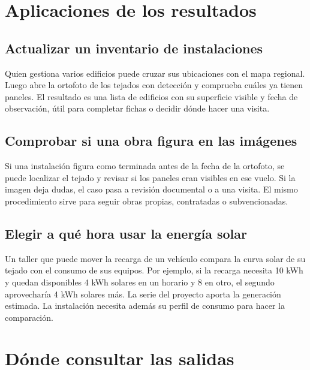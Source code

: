 \documentclass[11pt,a4paper]{article}
\begin{document}
\clearpage

\section{Aplicaciones de los resultados}

\subsection*{Actualizar un inventario de instalaciones}

Quien gestiona varios edificios puede cruzar sus ubicaciones con el mapa regional. Luego abre la ortofoto de los tejados con detección y comprueba cuáles ya tienen paneles. El resultado es una lista de edificios con su superficie visible y fecha de observación, útil para completar fichas o decidir dónde hacer una visita.

\subsection*{Comprobar si una obra figura en las imágenes}

Si una instalación figura como terminada antes de la fecha de la ortofoto, se puede localizar el tejado y revisar si los paneles eran visibles en ese vuelo. Si la imagen deja dudas, el caso pasa a revisión documental o a una visita. El mismo procedimiento sirve para seguir obras propias, contratadas o subvencionadas.

\subsection*{Elegir a qué hora usar la energía solar}

Un taller que puede mover la recarga de un vehículo compara la curva solar de su tejado con el consumo de sus equipos. Por ejemplo, si la recarga necesita 10 kWh y quedan disponibles 4 kWh solares en un horario y 8 en otro, el segundo aprovecharía 4 kWh solares más. La serie del proyecto aporta la generación estimada. La instalación necesita además su perfil de consumo para hacer la comparación.

\section{Dónde consultar las salidas}
\end{document}
